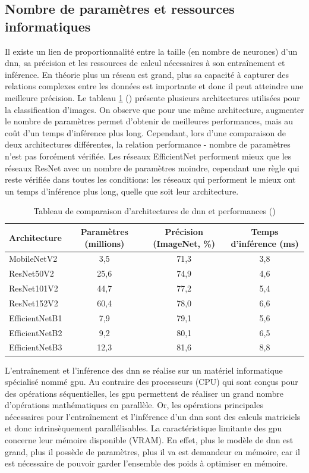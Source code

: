 \subsection{Nombre de paramètres et ressources informatiques}
Il existe un lien de proportionnalité entre la taille (en nombre de neurones) d'un \gls{dnn}, sa précision et les ressources de calcul nécessaires à son entraînement et inférence. En théorie plus un réseau est grand, plus sa capacité à capturer des relations complexes entre les données est importante et donc il peut atteindre une meilleure précision. Le tableau \ref{table:dnn-size} (\cite{chollet_keras_2023}) présente plusieurs architectures utilisées pour la classification d'images. On observe que pour une même architecture, augmenter le nombre de paramètres permet d'obtenir de meilleures performances, mais au coût d'un temps d'inférence plus long. Cependant, lors d'une comparaison de deux architectures différentes, la relation performance - nombre de paramètres n'est pas forcément vérifiée. Les réseaux EfficientNet performent mieux que les réseaux ResNet avec un nombre de paramètres moindre, cependant une règle qui reste vérifiée dans toutes les conditions: les réseaux qui performent le mieux ont un temps d'inférence plus long, quelle que soit leur architecture.

\begin{table}[!ht]
\centering
\begin{tabular}{|l|c|c|c|} 
 \hline
 Architecture & Paramètres (millions) & Précision (ImageNet, \%)  & Temps d'inférence (ms) \\
 \hline
MobileNetV2 & 3,5 & 71,3 & 3,8 \\
\hline
ResNet50V2 & 25,6 & 74,9 & 4,6 \\ 
ResNet101V2 & 44,7 & 77,2 & 5,4 \\ 
ResNet152V2 & 60,4 & 78,0 & 6,6 \\
\hline
EfficientNetB1 & 7,9 & 79,1 & 5,6 \\
EfficientNetB2 & 9,2 & 80,1& 6,5 \\
EfficientNetB3 & 12,3 & 81,6 & 8,8 \\
 \hline
\end{tabular}
\caption{Tableau de comparaison d'architectures de \gls{dnn} et performances (\cite{chollet_keras_2023})}
\label{table:dnn-size}
\end{table}

L'entraînement et l'inférence des \gls{dnn} se réalise sur un matériel informatique spécialisé nommé \gls{gpu}. Au contraire des processeurs (CPU) qui sont conçus pour des opérations séquentielles, les \gls{gpu} permettent de réaliser un grand nombre d'opérations mathématiques en parallèle. Or, les opérations principales nécessaires pour l'entraînement et l'inférence d'un \gls{dnn} sont des calculs matriciels et donc intrinsèquement parallélisables. La caractéristique limitante des \gls{gpu} concerne leur mémoire disponible (VRAM). En effet, plus le modèle de \gls{dnn} est grand, plus il possède de paramètres, plus il va est demandeur en mémoire, car il est nécessaire de pouvoir garder l'ensemble des poids à optimiser en mémoire. 


